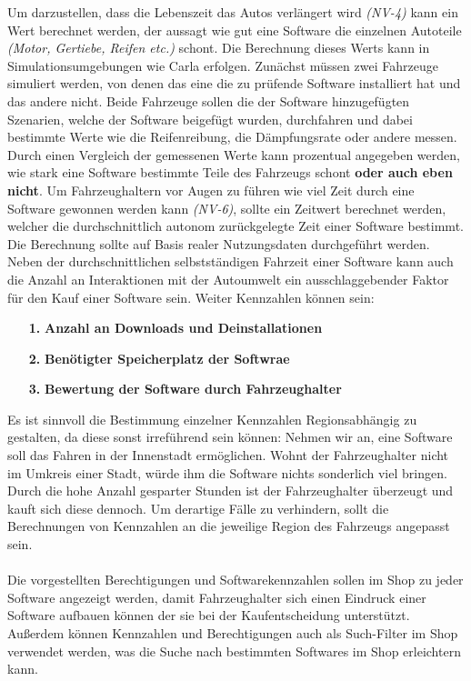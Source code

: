 Um darzustellen, dass die Lebenszeit das Autos verlängert wird \textit{(NV-4)} kann ein Wert berechnet werden, der aussagt wie gut eine Software die einzelnen Autoteile \textit{(Motor, Gertiebe, Reifen etc.)} schont. Die Berechnung dieses Werts kann in Simulationsumgebungen wie Carla erfolgen. Zunächst müssen zwei Fahrzeuge simuliert werden, von denen das eine die zu prüfende Software installiert hat und das andere nicht. Beide Fahrzeuge sollen die der Software hinzugefügten Szenarien, welche der Software beigefügt wurden, durchfahren und dabei bestimmte Werte wie die Reifenreibung, die Dämpfungsrate oder andere messen. Durch einen Vergleich der gemessenen Werte kann prozentual angegeben werden, wie stark eine Software bestimmte Teile des Fahrzeugs schont \textbf{oder auch eben nicht}. Um Fahrzeughaltern vor Augen zu führen wie viel Zeit durch eine Software gewonnen werden kann \textit{(NV-6)}, sollte ein Zeitwert berechnet werden, welcher die durchschnittlich autonom zurückgelegte Zeit einer Software bestimmt. Die Berechnung sollte auf Basis realer Nutzungsdaten durchgeführt werden. Neben der durchschnittlichen selbstständigen Fahrzeit einer Software kann auch die Anzahl an Interaktionen mit der Autoumwelt ein ausschlaggebender Faktor für den Kauf einer Software sein. Weiter Kennzahlen können sein:
\begin{itemize}
	\item[\textbf{1.}]\textbf{Anzahl an Downloads und Deinstallationen}
	\item[\textbf{2.}]\textbf{Benötigter Speicherplatz der Softwrae}
	\item[\textbf{3.}]\textbf{Bewertung der Software durch Fahrzeughalter}
\end{itemize}

Es ist sinnvoll die Bestimmung einzelner Kennzahlen Regionsabhängig zu gestalten, da diese sonst irreführend sein können: Nehmen wir an, eine Software soll das Fahren in der Innenstadt ermöglichen. Wohnt der Fahrzeughalter nicht im Umkreis einer Stadt, würde ihm die Software nichts sonderlich viel bringen. Durch die hohe Anzahl gesparter Stunden ist der Fahrzeughalter überzeugt und kauft sich diese dennoch. Um derartige Fälle zu verhindern, sollt die Berechnungen von Kennzahlen an die jeweilige Region des Fahrzeugs angepasst sein. \\\\
Die vorgestellten Berechtigungen und Softwarekennzahlen sollen im Shop zu jeder Software angezeigt werden, damit Fahrzeughalter sich einen Eindruck einer Software aufbauen können der sie bei der Kaufentscheidung unterstützt. Außerdem können Kennzahlen und Berechtigungen auch als Such-Filter im Shop verwendet werden, was die Suche nach bestimmten Softwares im Shop erleichtern kann. 


